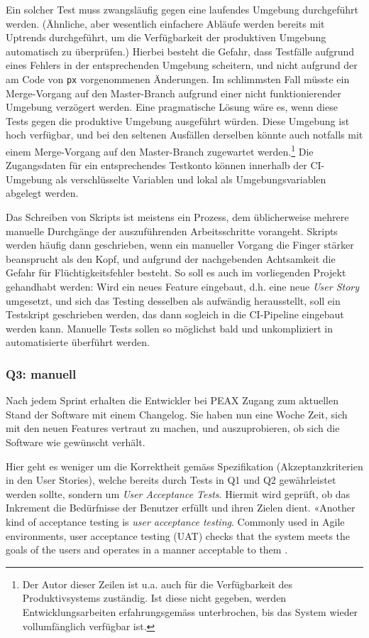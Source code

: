 Ein solcher Test muss zwangsläufig gegen eine laufendes Umgebung durchgeführt werden. (Ähnliche, aber wesentlich einfachere Abläufe werden bereits mit Uptrends durchgeführt, um die Verfügbarkeit der produktiven Umgebung automatisch zu überprüfen.) Hierbei besteht die Gefahr, dass Testfälle aufgrund eines Fehlers in der entsprechenden Umgebung scheitern, und nicht aufgrund der am Code von \texttt{px} vorgenommenen Änderungen. Im schlimmsten Fall müsste ein Merge-Vorgang auf den Master-Branch aufgrund einer nicht funktionierender Umgebung verzögert werden. Eine pragmatische Lösung wäre es, wenn diese Tests gegen die produktive Umgebung ausgeführt würden. Diese Umgebung ist hoch verfügbar, und bei den seltenen Ausfällen derselben könnte auch notfalls mit einem Merge-Vorgang auf den Master-Branch zugewartet werden.\footnote{Der Autor dieser Zeilen ist u.a. auch für die Verfügbarkeit des Produktivsystems zuständig. Ist diese nicht gegeben, werden Entwicklungsarbeiten erfahrungsgemäss unterbrochen, bis das System wieder vollumfänglich verfügbar ist.} Die Zugangsdaten für ein entsprechendes Testkonto können innerhalb der CI-Umgebung als verschlüsselte Variablen und lokal als Umgebungsvariablen abgelegt werden.

Das Schreiben von Skripts ist meistens ein Prozess, dem üblicherweise mehrere manuelle Durchgänge der auszuführenden Arbeitsschritte vorangeht. Skripts werden häufig dann geschrieben, wenn ein manueller Vorgang die Finger stärker beansprucht als den Kopf, und aufgrund der nachgebenden Achtsamkeit die Gefahr für Flüchtigkeitsfehler besteht. So soll es auch im vorliegenden Projekt gehandhabt werden: Wird ein neues Feature eingebaut, d.h. eine neue \textit{User Story} umgesetzt, und sich das Testing desselben als aufwändig herausstellt, soll ein Testskript geschrieben werden, das dann sogleich in die CI-Pipeline eingebaut werden kann. Manuelle Tests sollen so möglichst bald und unkompliziert in automatisierte überführt werden.

\subsubsection{Q3: manuell}

Nach jedem Sprint erhalten die Entwickler bei PEAX Zugang zum aktuellen Stand der Software mit einem Changelog. Sie haben nun eine Woche Zeit, sich mit den neuen Features vertraut zu machen, und auszuprobieren, ob sich die Software wie gewünscht verhält.

Hier geht es weniger um die Korrektheit gemäss Spezifikation (Akzeptanzkriterien in den User Stories), welche bereits durch Tests in Q1 und Q2 gewährleistet werden sollte, sondern um \textit{User Acceptance Tests}. Hiermit wird geprüft, ob das Inkrement die Bedürfnisse der Benutzer erfüllt und ihren Zielen dient. «Another kind of acceptance testing is \textit{user acceptance testing}. Commonly used in Agile environments, user acceptance testing (UAT) checks that the system meets the goals of the users and operates in a manner acceptable to them \cite[S. 85]{testing}.


